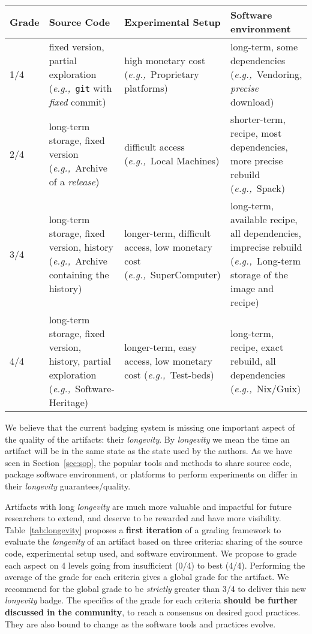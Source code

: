 \documentclass[sigconf,natbib=false]{acmart}
\newcommand{\eg}{\emph{e.g.,}}
\begin{document}
\begin{table*}
  \caption{\label{tab:longevity}Proposition of grading framework for evaluating the \emph{longevity} of an artifact.}
  \centering
    \begin{tabularx}{\textwidth}{l X X X}
  \toprule
      Grade & Source Code &  Experimental Setup & Software environment \\
  \midrule
      1/4 & fixed version, partial exploration (\eg\ \texttt{git} with \emph{fixed} commit) &  high monetary cost (\eg\ Proprietary platforms) & long-term, some dependencies (\eg\ Vendoring, \emph{precise} download) \\
       \midrule
      2/4 & long-term storage, fixed version (\eg\ Archive of a \emph{release}) & difficult access (\eg\ Local Machines) & shorter-term, recipe, most dependencies, more precise rebuild (\eg\ Spack) \\
       \midrule
      3/4 & long-term storage, fixed version, history (\eg\ Archive containing the history) & longer-term, difficult access, low monetary cost (\eg\ SuperComputer) & long-term, available recipe, all dependencies, imprecise rebuild (\eg\ Long-term storage of the image and recipe) \\
       \midrule
      4/4 & long-term storage, fixed version, history, partial exploration (\eg\ Software-Heritage) & longer-term, easy access, low monetary cost (\eg\ Test-beds) & long-term, recipe, exact rebuild, all dependencies (\eg\ Nix/Guix) \\
  \bottomrule
  \end{tabularx}
\end{table*}

We believe that the current badging system is missing one important aspect of the quality of the artifacts: their \emph{longevity}.
By \emph{longevity} we mean the time an artifact will be in the same state as the state used by the authors.
As we have seen in Section\ \ref{sec:sop}, the popular tools and methods to share source code, package software environment, or platforms to perform experiments on differ in their \emph{longevity} guarantees/quality.

Artifacts with long \emph{longevity} are much more valuable and impactful for future researchers to extend, and deserve to be rewarded and have more visibility.
Table\ \ref{tab:longevity} proposes a \textbf{first iteration} of a grading framework to evaluate the \emph{longevity} of an artifact based on three criteria: sharing of the source code, experimental setup used, and software environment.
We propose to grade each aspect on 4 levels going from insufficient (0/4) to best (4/4).
Performing the average of the grade for each criteria gives a global grade for the artifact.
We recommend for the global grade to be \emph{strictly} greater than 3/4 to deliver this new \emph{longevity} badge.
  The specifics of the grade for each criteria \textbf{should be further discussed in the community}, to reach a consensus on desired good practices.
They are also bound to change as the software tools and practices evolve.
\end{document}
